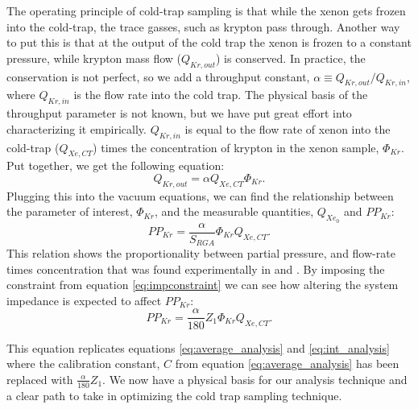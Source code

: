 \documentclass[12pt]{article}
\begin{document}
The operating principle of cold-trap sampling is that while the xenon gets frozen into the cold-trap, the trace gasses, such as krypton pass through. Another way to put this is that at the output of the cold trap the xenon is frozen to a constant pressure, while krypton mass flow ($Q_{Kr,out}$) is conserved. In practice, the conservation is not perfect, so we add a throughput constant, $\alpha \equiv Q_{Kr,out}/Q_{Kr,in}$, where $Q_{Kr,in}$ is the flow rate into the cold trap. The physical basis of the throughput parameter is not known, but we have put great effort into characterizing it empirically. $Q_{Kr,in}$ is equal to the flow rate of xenon into the cold-trap ($Q_{Xe,CT}$) times the concentration of krypton in the xenon sample, $\Phi_{Kr}$. Put together, we get the following equation: 
\begin{equation}
Q_{Kr,out}=\alpha Q_{Xe,CT}\Phi_{Kr}.
\end{equation}
Plugging this into the vacuum equations, we can find the relationship between the parameter of interest, $\Phi_{Kr}$, and the measurable quantities, $Q_{Xe_0}$ and $PP_{Kr}$:
\begin{equation}
\label{eq:krpres1}
PP_{Kr}=\frac{\alpha}{S_{RGA}}\Phi_{Kr}Q_{Xe,CT}.
\end{equation}
This relation shows the proportionality between partial pressure, and flow-rate times concentration that was found experimentally in \cite{sampling_doug} and \cite{sampling_dm}. By imposing the constraint from equation \ref{eq:impconstraint} we can see how altering the system impedance is expected to affect $PP_{Kr}$:
\begin{equation}
\label{eq:krpres2}
PP_{Kr}=\frac{\alpha}{180}Z_{1}\Phi_{Kr}Q_{Xe,CT}.
\end{equation}

This equation replicates equations \ref{eq:average_analysis} and \ref{eq:int_analysis} where the calibration constant, $C$ from equation \ref{eq:average_analysis} has been replaced with $\frac{\alpha}{180}Z_{1}$. We now have a physical basis for our analysis technique and a clear path to take in optimizing the cold trap sampling technique. 
\end{document}
